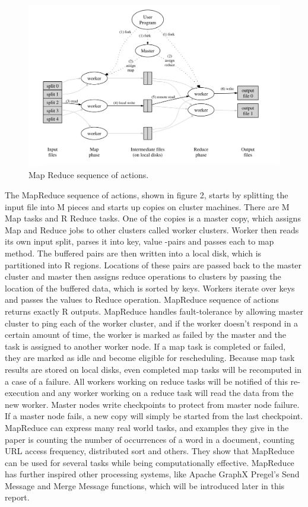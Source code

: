 \documentclass{article}
\theoremstyle{definition}
\begin{document}
\begin{figure}[H]
\centering
\includegraphics[scale=0.4]{mapreducefigure}
\caption{Map Reduce sequence of actions. }
\end{figure}

The MapReduce sequence of actions, shown in figure 2, starts by splitting the input file into M pieces and starts up copies on cluster machines. There are M Map tasks and R Reduce tasks. One of the copies is a master copy, which assigns Map and Reduce jobs to other clusters called worker clusters. Worker then reads its own input split, parses it into key, value -pairs and passes each to map method. The buffered pairs are then written into a local disk, which is partitioned into R regions. Locations of these pairs are passed back to the master cluster and master then assigns reduce operations to clusters by passing the location of the buffered data, which is sorted by keys. Workers iterate over keys and passes the values to Reduce operation. MapReduce sequence of actions returns exactly R outputs. 
MapReduce handles fault-tolerance by allowing master cluster to ping each of the worker cluster, and if the worker doesn't respond in a certain amount of time, the worker is marked as failed by the master and the task is assigned to another worker node. If a map task is completed or failed, they are marked as idle and become eligible for rescheduling. Because map task results are stored on local disks, even completed map tasks will be recomputed in a case of a failure. All workers working on reduce tasks will be notified of this re-execution and any worker working on a reduce task will read the data from the new worker. Master nodes write checkpoints to protect from master node failure. If a master node fails, a new copy will simply be started from the last checkpoint.
MapReduce can express many real world tasks, and examples they give in the paper is counting the number of occurrences of a word in a document, counting URL access frequency, distributed sort and others. They show that MapReduce can be used for several tasks while being computationally effective. MapReduce has further inspired other processing systems, like Apache GraphX Pregel's Send Message and Merge Message functions, which will be introduced later in this report. \\ 
\end{document}
